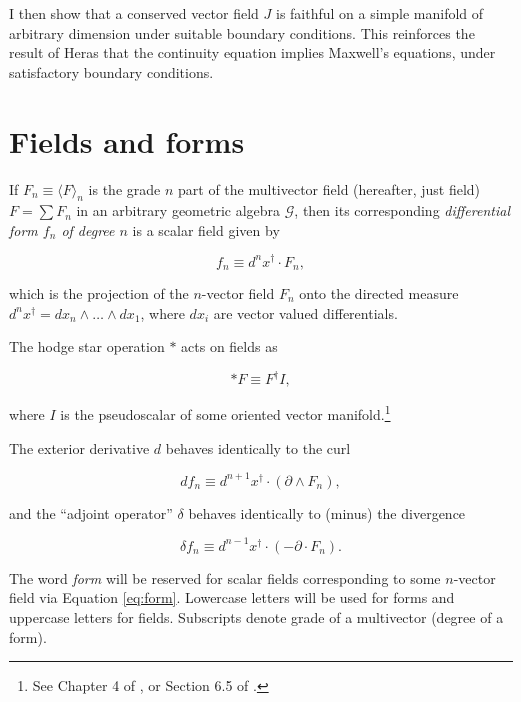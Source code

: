 \documentclass[twocolumn]{article}
\begin{document}
I then show that a conserved vector field $J$ is faithful on a simple manifold of arbitrary dimension under suitable boundary conditions. This reinforces the result of Heras that the continuity equation implies Maxwell's equations, under satisfactory boundary conditions.

\section{Fields and forms} If $F_n \equiv \langle F \rangle_n$ is the grade $n$ part of the multivector field (hereafter, just field) $F = \sum F_n$ in an arbitrary geometric algebra $\mathcal{G}$, then its corresponding \emph{differential form $f_n$ of degree $n$} is a scalar field given by \cite{cagc}

\begin{equation}
  f_n \equiv d^nx^\dagger \cdot F_n,\label{eq:form}
\end{equation}

which is the projection of the $n$-vector field $F_n$ onto the directed measure $d^nx^\dagger = dx_n \wedge \dots \wedge dx_1$, where $dx_i$ are vector valued differentials. 

The hodge star operation $*$ acts on fields as

\begin{equation}
  *F \equiv F^\dagger I,\label{eq:hodge}
\end{equation}

where $I$ is the pseudoscalar of some oriented vector manifold.\footnote{See Chapter 4 of \cite{cagc}, or Section 6.5 of \cite{gap}.}

The exterior derivative $d$ behaves identically to the curl

\begin{equation}
  d f_n \equiv d^{n+1}x^\dagger \cdot (\partial \wedge F_n),\label{eq:curl}
\end{equation}

and the ``adjoint operator'' $\delta$ behaves identically to (minus) the divergence

\begin{equation}
  \delta f_n \equiv d^{n-1}x^\dagger \cdot (-\partial \cdot F_n).\label{eq:divergence}
\end{equation} 

The word \emph{form} will be reserved for scalar fields corresponding to some $n$-vector field via Equation \ref{eq:form}. Lowercase letters will be used for forms and uppercase letters for fields. Subscripts denote grade of a multivector (degree of a form).
\end{document}
